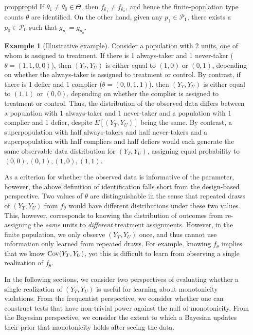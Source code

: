 \documentclass[12pt,reqno]{amsart}
\theoremstyle{theorem}
\theoremstyle{definition}
\newtheorem{example}{Example}
\newcommand{\0}{\mathbf{0}}
\newcommand{\1}{\mathbf{1}}
\begin{document}
\begin{restatable}{prop}{propid}
\label{prop:id}
If $\theta_1 \neq \theta_0 \in \Theta$, then $f_{\theta_1} \neq f_{\theta_0}$, and hence the finite-population type counts $\theta$ are identified. On the
other hand, given any $p_1 \in \mathcal P_1$, there exists a $p_0 \in \mathcal P_0$ such
that $g_{p_1} = g_{p_0}$. 
\end{restatable}

\begin{example}[Illustrative example] \label{ex:2 units}
Consider a population with 2 units, one of whom is assigned to treatment. If there is 1 always-taker and 1 never-taker ($\theta = (1,1,0,0)$), then $(Y_T,Y_U)$ is either equal to $(1,0)$ or $(0,1)$, depending on whether the always-taker is assigned to treatment or control. By contrast, if there is 1 defier and 1 complier ($\theta = (0,0,1,1)$), then $(Y_T,Y_U)$ is either equal to $(1,1)$ or $(0,0)$, depending on whether the complier is assigned to treatment or control. Thus, the distribution of the observed data differs between a population with 1 always-taker and 1 never-taker and a population with 1 complier and 1 defier, despite $E[(Y_T,Y_U)]$ being the same. By contrast, a superpopulation with half always-takers and half never-takers and a superpopulation with half compliers and half defiers would each generate the same observable data distribution for $(Y_T,Y_U)$, assigning equal probability to $(0,0), (0,1), (1,0), (1,1)$. 
\end{example}


As a criterion for whether the observed data is informative of the parameter, however, the
above definition of identification falls short from the design-based perspective. Two
values of $\theta$ are distinguishable in the sense that repeated draws of $(Y_T, Y_U)$
from $f_\theta$ would have different distributions under these two values. This, however,
corresponds to knowing the distribution of outcomes from re-assigning the \emph{same}
units to \emph{different} treatment assignments. However, in the finite population, we only
observe $(Y_T, Y_U)$ once, and thus cannot use information only learned from repeated
draws. For example, knowing $f_\theta$ implies that we know $\operatorname{Cov}(Y_T,Y_U)$, yet this is
difficult to learn from observing a {single} realization of $f_\theta$.

In the following sections, we consider two perspectives of evaluating whether a single realization of $(Y_T,Y_U)$ is useful for learning about monotonicity violations. From the frequentist perspective, we consider whether one can construct tests that have non-trivial power against the null of monotonicity. From the Bayesian perspective, we consider the extent to which a Bayesian updates their prior that monotonicity holds after seeing the data. 
\end{document}

